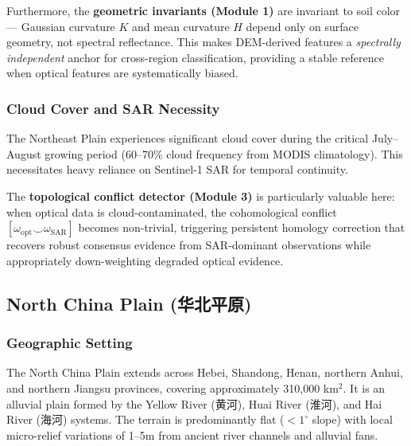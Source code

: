 Furthermore, the \textbf{geometric invariants (Module 1)} are invariant to soil
color — Gaussian curvature $K$ and mean curvature $H$ depend only on surface
geometry, not spectral reflectance. This makes DEM-derived features a
\textit{spectrally independent} anchor for cross-region classification, providing
a stable reference when optical features are systematically biased.

\subsubsection{Cloud Cover and SAR Necessity}

The Northeast Plain experiences significant cloud cover during the critical
July--August growing period (60--70\% cloud frequency from MODIS climatology).
This necessitates heavy reliance on Sentinel-1 SAR for temporal continuity.

The \textbf{topological conflict detector (Module 3)} is particularly valuable
here: when optical data is cloud-contaminated, the cohomological conflict
$[\omega_{\text{opt}} \smile \omega_{\text{SAR}}]$ becomes non-trivial,
triggering persistent homology correction that recovers robust consensus
evidence from SAR-dominant observations while appropriately down-weighting
degraded optical evidence.

\subsection{North China Plain (华北平原)}

\subsubsection{Geographic Setting}

The North China Plain extends across Hebei, Shandong, Henan, northern Anhui,
and northern Jiangsu provinces, covering approximately 310,000 km$^2$. It is
an alluvial plain formed by the Yellow River (黄河), Huai River (淮河), and
Hai River (海河) systems. The terrain is predominantly flat ($<1^\circ$ slope)
with local micro-relief variations of 1--5m from ancient river channels and
alluvial fans.


